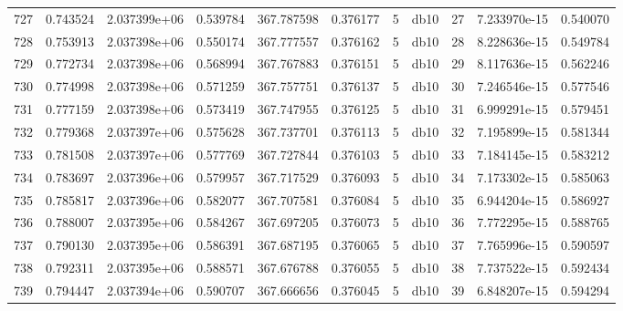 \begin{tabular}{lrrrrrrlrrr}
727  &    0.743524 &        2.037399e+06 &  0.539784 &              367.787598 &    0.376177 &       5 &         db10 &     27 &   7.233970e-15 &      0.540070 \\
728  &    0.753913 &        2.037398e+06 &  0.550174 &              367.777557 &    0.376162 &       5 &         db10 &     28 &   8.228636e-15 &      0.549784 \\
729  &    0.772734 &        2.037398e+06 &  0.568994 &              367.767883 &    0.376151 &       5 &         db10 &     29 &   8.117636e-15 &      0.562246 \\
730  &    0.774998 &        2.037398e+06 &  0.571259 &              367.757751 &    0.376137 &       5 &         db10 &     30 &   7.246546e-15 &      0.577546 \\
731  &    0.777159 &        2.037398e+06 &  0.573419 &              367.747955 &    0.376125 &       5 &         db10 &     31 &   6.999291e-15 &      0.579451 \\
732  &    0.779368 &        2.037397e+06 &  0.575628 &              367.737701 &    0.376113 &       5 &         db10 &     32 &   7.195899e-15 &      0.581344 \\
733  &    0.781508 &        2.037397e+06 &  0.577769 &              367.727844 &    0.376103 &       5 &         db10 &     33 &   7.184145e-15 &      0.583212 \\
734  &    0.783697 &        2.037396e+06 &  0.579957 &              367.717529 &    0.376093 &       5 &         db10 &     34 &   7.173302e-15 &      0.585063 \\
735  &    0.785817 &        2.037396e+06 &  0.582077 &              367.707581 &    0.376084 &       5 &         db10 &     35 &   6.944204e-15 &      0.586927 \\
736  &    0.788007 &        2.037395e+06 &  0.584267 &              367.697205 &    0.376073 &       5 &         db10 &     36 &   7.772295e-15 &      0.588765 \\
737  &    0.790130 &        2.037395e+06 &  0.586391 &              367.687195 &    0.376065 &       5 &         db10 &     37 &   7.765996e-15 &      0.590597 \\
738  &    0.792311 &        2.037395e+06 &  0.588571 &              367.676788 &    0.376055 &       5 &         db10 &     38 &   7.737522e-15 &      0.592434 \\
739  &    0.794447 &        2.037394e+06 &  0.590707 &              367.666656 &    0.376045 &       5 &         db10 &     39 &   6.848207e-15 &      0.594294 \\

\end{tabular}
